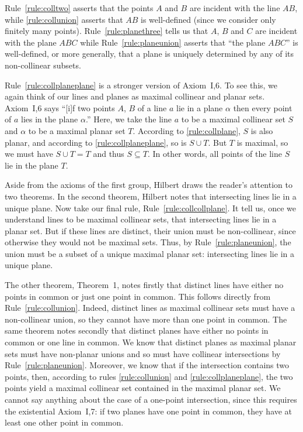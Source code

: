 Rule~\eqref{rule:colltwo} asserts that the points $A$ and $B$ are incident with the line $AB$, while \eqref{rule:collunion} asserts that $AB$ is well-defined (since we consider only finitely many points). Rule~\eqref{rule:planethree} tells us that $A$, $B$ and $C$ are incident with the plane $ABC$ while Rule~\eqref{rule:planeunion} asserts that ``the plane $ABC$'' is well-defined, or more generally, that a plane is uniquely determined by any of its non-collinear subsets.

Rule~\eqref{rule:collplaneplane} is a stronger version of Axiom~I,6. To see this, we again think of our lines and planes as maximal collinear and planar sets. Axiom~I,6 says ``[i]f two points $A$, $B$ of a line $a$ lie in a plane $\alpha$ then every point of $a$ lies in the plane $\alpha$.'' Here, we take the line $a$ to be a maximal collinear set $S$ and $\alpha$ to be a maximal planar set $T$. According to \eqref{rule:collplane}, $S$ is also planar, and according to \eqref{rule:collplaneplane}, so is $S \cup T$. But $T$ is maximal, so we must have $S \cup T = T$ and thus $S \subseteq T$. In other words, all points of the line $S$ lie in the plane $T$.

Aside from the axioms of the first group, Hilbert draws the reader's attention to two theorems. In the second theorem, Hilbert notes that intersecting lines lie in a unique plane. Now take our final rule, Rule~\eqref{rule:collcollplane}. It tell us, once we understand lines to be maximal collinear sets, that intersecting lines lie in a planar set. But if these lines are distinct, their union must be non-collinear, since otherwise they would not be maximal sets. Thus, by Rule~\eqref{rule:planeunion}, the union must be a subset of a unique maximal planar set: intersecting lines lie in a unique plane.

The other theorem, Theorem~1, notes firstly that distinct lines have either no points in common or just one point in common. This follows directly from Rule~\eqref{rule:collunion}. Indeed, distinct lines as maximal collinear sets must have a non-collinear union, so they cannot have more than one point in common. The same theorem notes secondly that distinct planes have either no points in common or one line in common. We know that distinct planes as maximal planar sets must have non-planar unions and so must have collinear intersections by Rule~\eqref{rule:planeunion}. Moreover, we know that if the intersection contains two points, then, according to rules \eqref{rule:collunion} and \eqref{rule:collplaneplane}, the two points yield a maximal collinear set contained in the maximal planar set. We cannot say anything about the case of a one-point intersection, since this requires the existential Axiom~I,7: if two planes have one point in common, they have at least one other point in common.


